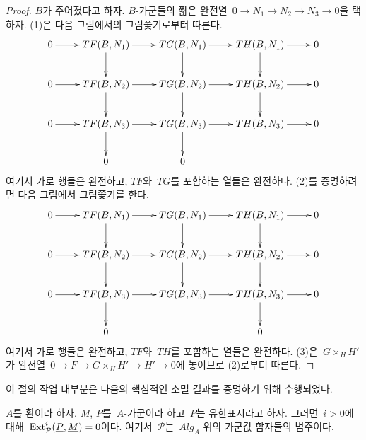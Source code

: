\begin{proof}
$B$가 주어졌다고 하자. $B$-가군들의 짧은 완전열\ 
$0 \to N_1 \to N_2 \to N_3 \to 0$을 택하자. (1)은 다음 그림에서의
그림쫓기로부터 따른다.
$$
\xymatrix{
0 \ar[r] &
TF(B, N_1) \ar[r] \ar[d] &
TG(B, N_1) \ar[r] \ar[d] &
TH(B, N_1) \ar[r] \ar[d] & 0 \\
0 \ar[r] &
TF(B, N_2) \ar[r] \ar[d] &
TG(B, N_2) \ar[r] \ar[d] &
TH(B, N_2) \ar[r] \ar[d] & 0 \\
0 \ar[r] &
TF(B, N_3) \ar[r] \ar[d] &
TG(B, N_3) \ar[r] \ar[d] &
TH(B, N_3) \ar[r] & 0 \\
& 0 & 0
}
$$
여기서 가로 행들은 완전하고, $TF$와\  $TG$를 포함하는 열들은
완전하다. (2)를 증명하려면 다음 그림에서 그림쫓기를 한다.
$$
\xymatrix{
0 \ar[r] &
TF(B, N_1) \ar[r] \ar[d] &
TG(B, N_1) \ar[r] \ar[d] &
TH(B, N_1) \ar[r] \ar[d] & 0 \\
0 \ar[r] &
TF(B, N_2) \ar[r] \ar[d] &
TG(B, N_2) \ar[r] \ar[d] &
TH(B, N_2) \ar[r] \ar[d] & 0 \\
0 \ar[r] &
TF(B, N_3) \ar[r] \ar[d] &
TG(B, N_3) \ar[r] &
TH(B, N_3) \ar[r] \ar[d] & 0 \\
& 0 & & 0
}
$$
여기서 가로 행들은 완전하고, $TF$와\  $TH$를 포함하는 열들은
완전하다. (3)은\  $G \times_H H'$가 완전열\ 
$0 \to F \to G \times_H H' \to H' \to 0$에 놓이므로 (2)로부터
따른다.
\end{proof}

\noindent
이 절의 작업 대부분은 다음의 핵심적인 소멸 결과를 증명하기 위해
수행되었다.

\begin{lemma}
\label{lemma-ext-group-zero-key}
$A$를 환이라 하자. $M$, $P$를\  $A$-가군이라 하고\  $P$는 유한표시라고
하자. 그러면\  $i > 0$에 대해\ 
$\mathop{\mathrm{Ext}}\nolimits^i_\mathcal{P}(\underline{P}, \underline{M}) = 0$이다. 여기서\ 
$\mathcal{P}$는\  $\textit{Alg}_A$ 위의 가군값 함자들의 범주이다.
\end{lemma}

